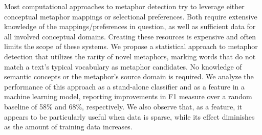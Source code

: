 Most computational approaches to metaphor detection try to leverage either conceptual metaphor mappings or selectional preferences. Both require extensive knowledge of the mappings/preferences in question, as well as sufficient data for all involved conceptual domains. Creating these resources is expensive and often limits the scope of these systems. We propose a statistical approach to metaphor detection that utilizes the rarity of novel metaphors, marking words that do not match a text's typical vocabulary as metaphor candidates. No knowledge of semantic concepts or the metaphor's source domain is required. We analyze the performance of this approach as a stand-alone classifier and as a feature in a machine learning model, reporting improvements in F1 measure over a random baseline of 58\% and 68\%, respectively. We also observe that, as a feature, it appears to be particularly useful when data is sparse, while its effect diminishes as the amount of training data increases.
